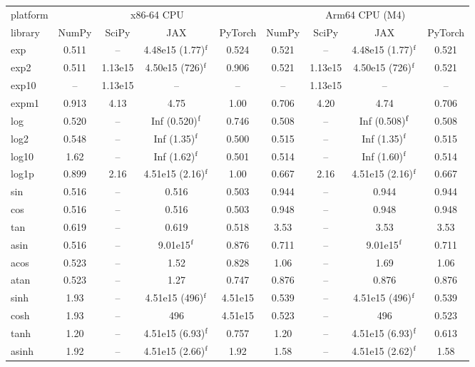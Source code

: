 \begin{table}
\centering
\begin{small}
\begin{tabular}{|l|cccc|cccc|}
\hline
platform & \multicolumn{4}{c|}{x86-64 CPU} & \multicolumn{4}{c|}{Arm64 CPU (M4)} \\
library & NumPy & SciPy & JAX & PyTorch & NumPy & SciPy & JAX & PyTorch \\ \hline
exp & 0.511 & -- & 4.48e15 (1.77)$^{\rm f}$ & 0.524 & 0.521 & -- & 4.48e15 (1.77)$^{\rm f}$ & 0.521 \\
exp2 & 0.511 & 1.13e15 & 4.50e15 (726)$^{\rm f}$ & 0.906 & 0.521 & 1.13e15 & 4.50e15 (726)$^{\rm f}$ & 0.521 \\
exp10 & -- & 1.13e15 & -- & -- & -- & 1.13e15 & -- & -- \\
expm1 & 0.913 & 4.13 & 4.75 & 1.00 & 0.706 & 4.20 & 4.74 & 0.706 \\
log & 0.520 & -- & Inf (0.520)$^{\rm f}$ & 0.746 & 0.508 & -- & Inf (0.508)$^{\rm f}$ & 0.508 \\
log2 & 0.548 & -- & Inf (1.35)$^{\rm f}$ & 0.500 & 0.515 & -- & Inf (1.35)$^{\rm f}$ & 0.515 \\
log10 & 1.62 & -- & Inf (1.62)$^{\rm f}$ & 0.501 & 0.514 & -- & Inf (1.60)$^{\rm f}$ & 0.514 \\
log1p & 0.899 & 2.16 & 4.51e15 (2.16)$^{\rm f}$ & 1.00 & 0.667 & 2.16 & 4.51e15 (2.16)$^{\rm f}$ & 0.667 \\
sin & 0.516 & -- & 0.516 & 0.503 & 0.944 & -- & 0.944 & 0.944 \\
cos & 0.516 & -- & 0.516 & 0.503 & 0.948 & -- & 0.948 & 0.948 \\
tan & 0.619 & -- & 0.619 & 0.518 & 3.53 & -- & 3.53 & 3.53 \\
asin & 0.516 & -- & 9.01e15$^{\rm f}$ & 0.876 & 0.711 & -- & 9.01e15$^{\rm f}$ & 0.711 \\
acos & 0.523 & -- & 1.52 & 0.828 & 1.06 & -- & 1.69 & 1.06 \\
atan & 0.523 & -- & 1.27 & 0.747 & 0.876 & -- & 0.876 & 0.876 \\
sinh & 1.93 & -- & 4.51e15 (496)$^{\rm f}$ & 4.51e15 & 0.539 & -- & 4.51e15 (496)$^{\rm f}$ & 0.539 \\
cosh & 1.93 & -- & 496 & 4.51e15 & 0.523 & -- & 496 & 0.523 \\
tanh & 1.20 & -- & 4.51e15 (6.93)$^{\rm f}$ & 0.757 & 1.20 & -- & 4.51e15 (6.93)$^{\rm f}$ & 0.613 \\
asinh & 1.92 & -- & 4.51e15 (2.66)$^{\rm f}$ & 1.92 & 1.58 & -- & 4.51e15 (2.62)$^{\rm f}$ & 1.58 \\

\end{tabular}
\end{small}
\end{table}
